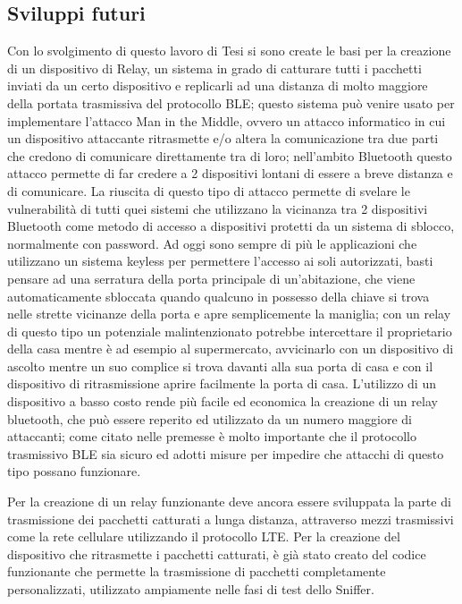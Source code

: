 \subsection{Sviluppi futuri}
Con lo svolgimento di questo lavoro di Tesi si sono create le basi per la creazione di un dispositivo di Relay, un sistema in grado di catturare tutti i pacchetti inviati da un certo dispositivo e replicarli ad una distanza di molto maggiore della portata trasmissiva del protocollo BLE; questo sistema può venire usato per implementare l'attacco Man in the Middle, ovvero un attacco informatico in cui un dispositivo attaccante ritrasmette e/o altera la comunicazione tra due parti che credono di comunicare direttamente tra di loro; nell'ambito Bluetooth questo attacco permette di far credere a 2 dispositivi lontani  di essere a breve distanza e di comunicare. 
La riuscita di questo tipo di attacco permette di svelare le vulnerabilità di tutti quei sistemi che utilizzano la vicinanza tra 2 dispositivi Bluetooth come metodo di accesso a dispositivi protetti da un sistema di sblocco, normalmente con password.
Ad oggi sono sempre di più le applicazioni che utilizzano un sistema keyless per permettere l'accesso ai soli autorizzati, basti pensare ad una serratura della porta principale di un'abitazione, che viene automaticamente sbloccata quando qualcuno in possesso della chiave si trova nelle strette vicinanze della porta e apre semplicemente la maniglia; con un relay di questo tipo un potenziale malintenzionato potrebbe intercettare il proprietario della casa mentre è ad esempio al supermercato, avvicinarlo con un dispositivo di ascolto mentre un suo complice si trova davanti alla sua porta di casa e con il dispositivo di ritrasmissione aprire facilmente la porta di casa.
L'utilizzo di un dispositivo a basso costo rende più facile ed economica la creazione di un relay bluetooth, che può essere reperito ed utilizzato da un numero maggiore di attaccanti; come citato nelle premesse è molto importante che il protocollo trasmissivo BLE sia sicuro ed adotti misure per impedire che attacchi di questo tipo possano funzionare.

Per la creazione di un relay funzionante deve ancora essere sviluppata la parte di trasmissione dei pacchetti catturati a lunga distanza, attraverso mezzi trasmissivi come la rete cellulare utilizzando il protocollo LTE. Per la creazione del dispositivo che ritrasmette i pacchetti catturati, è già stato creato del codice funzionante che permette la trasmissione di pacchetti completamente personalizzati, utilizzato ampiamente nelle fasi di test dello Sniffer.